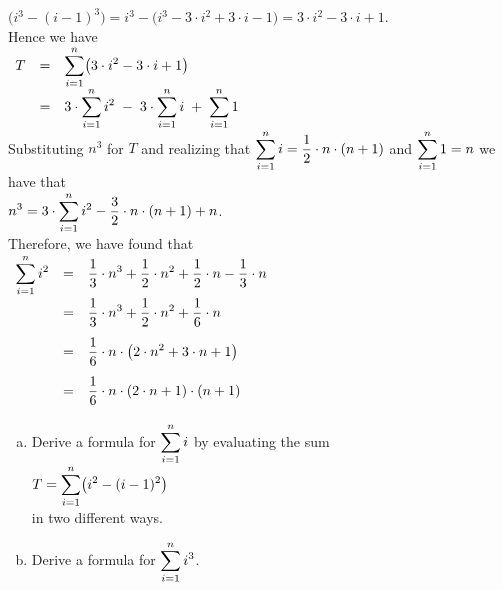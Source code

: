 $ \bigl(i^3 - (i-1)^3\bigr) = i^3 - \bigl(i^3 - 3 \cdot i^2 + 3 \cdot i - 1\bigr) = 3 \cdot i^2 - 3 \cdot i + 1$.
\\[0.2cm]
Hence we have
\\[0.2cm]
\hspace*{1.3cm}
$
\begin{array}{lclcl}
  T & = & \displaystyle \sum\limits_{i=1}^n \bigl(3 \cdot i^2 - 3 \cdot i + 1\bigr) \\[0.2cm]
    & = & \displaystyle 3 \cdot \sum\limits_{i=1}^n i^2 \; -\;  3 \cdot \sum\limits_{i=1}^n i \;+\; \sum\limits_{i=1}^n 1
\end{array}
$
\\[0.2cm]
Substituting $n^3$ for $T$ and realizing that $\displaystyle\sum\limits_{i=1}^n i = \frac{1}{2} \cdot n \cdot (n+1)$ and
$\displaystyle\sum\limits_{i=1}^n 1 = n$ we have that
\\[0.2cm]
\hspace*{1.3cm}
$\displaystyle n^3 = 3 \cdot \sum\limits_{i=1}^n i^2 - \frac{3}{2} \cdot n \cdot (n+1) + n$.
\\[0.2cm]
Therefore, we have found that
\\[0.2cm]
\hspace*{1.3cm}
$
\begin{array}{lcl}
\displaystyle \sum\limits_{i=1}^n i^2 & = &  \displaystyle\frac{1}{3} \cdot n^3 + \frac{1}{2} \cdot n^2 + \frac{1}{2} \cdot n -
                                  \frac{1}{3} \cdot n  \\[0.4cm]
                          & = &   \displaystyle\frac{1}{3} \cdot n^3 + \frac{1}{2} \cdot n^2 + \frac{1}{6} \cdot n
  \\[0.4cm]
                         & = &   \displaystyle\frac{1}{6} \cdot n \cdot \bigl(2 \cdot n^2 + 3 \cdot n + 1 \bigr)
  \\[0.4cm]
                         & = &   \displaystyle\frac{1}{6} \cdot n \cdot (2 \cdot n + 1) \cdot (n + 1)  \\[0.2cm]
\end{array}
$

\exercise
\begin{enumerate}[(a)]
\item Derive a formula for $\displaystyle\sum\limits_{i=1}^n i$ by evaluating the sum \\
      \hspace*{1.3cm}
      $\displaystyle T = \sum\limits_{i=1}^n \bigl(i^2 - (i-1)^2\bigr)$
      \\[0.2cm]
      in two different ways.  
\item Derive a formula for $\displaystyle\sum\limits_{i=1}^n i^3$.   \eoxs
\end{enumerate}

